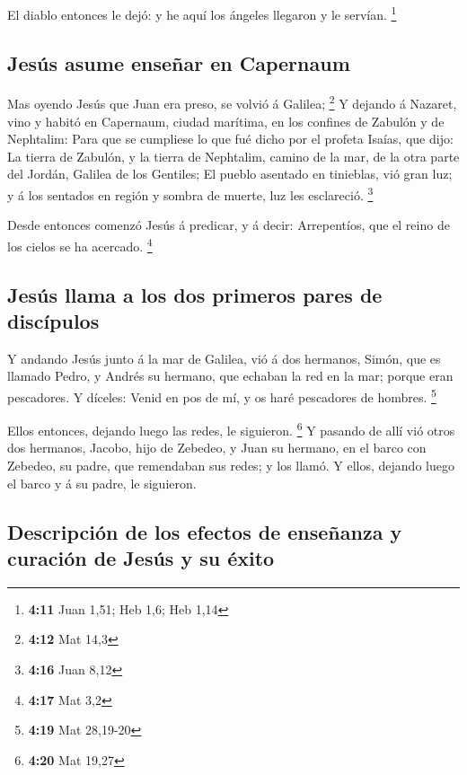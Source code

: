  El diablo entonces le dejó: y he aquí los ángeles llegaron
y le servían. \footnote{\textbf{4:11} Juan 1,51; Heb 1,6; Heb 1,14}

\hypertarget{jesuxfas-asume-enseuxf1ar-en-capernaum}{%
\subsection{Jesús asume enseñar en
Capernaum}\label{jesuxfas-asume-enseuxf1ar-en-capernaum}}

 Mas oyendo Jesús que Juan era preso, se volvió á Galilea;
\footnote{\textbf{4:12} Mat 14,3}  Y dejando á Nazaret,
vino y habitó en Capernaum, ciudad marítima, en los confines de Zabulón
y de Nephtalim:  Para que se cumpliese lo que fué dicho por
el profeta Isaías, que dijo:  La tierra de Zabulón, y la
tierra de Nephtalim, camino de la mar, de la otra parte del Jordán,
Galilea de los Gentiles;  El pueblo asentado en tinieblas,
vió gran luz; y á los sentados en región y sombra de muerte, luz les
esclareció. \footnote{\textbf{4:16} Juan 8,12}

 Desde entonces comenzó Jesús á predicar, y á decir:
Arrepentíos, que el reino de los cielos se ha acercado. \footnote{\textbf{4:17}
  Mat 3,2}

\hypertarget{jesuxfas-llama-a-los-dos-primeros-pares-de-discuxedpulos}{%
\subsection{Jesús llama a los dos primeros pares de
discípulos}\label{jesuxfas-llama-a-los-dos-primeros-pares-de-discuxedpulos}}

 Y andando Jesús junto á la mar de Galilea, vió á dos
hermanos, Simón, que es llamado Pedro, y Andrés su hermano, que echaban
la red en la mar; porque eran pescadores.  Y díceles: Venid
en pos de mí, y os haré pescadores de hombres. \footnote{\textbf{4:19}
  Mat 28,19-20}

 Ellos entonces, dejando luego las redes, le siguieron.
\footnote{\textbf{4:20} Mat 19,27}  Y pasando de allí vió
otros dos hermanos, Jacobo, hijo de Zebedeo, y Juan su hermano, en el
barco con Zebedeo, su padre, que remendaban sus redes; y los llamó.
 Y ellos, dejando luego el barco y á su padre, le
siguieron.

\hypertarget{descripciuxf3n-de-los-efectos-de-enseuxf1anza-y-curaciuxf3n-de-jesuxfas-y-su-uxe9xito}{%
\subsection{Descripción de los efectos de enseñanza y curación de Jesús
y su
éxito}\label{descripciuxf3n-de-los-efectos-de-enseuxf1anza-y-curaciuxf3n-de-jesuxfas-y-su-uxe9xito}}

